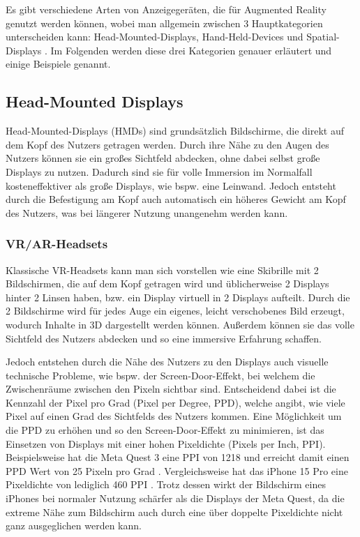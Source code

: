   Es gibt verschiedene Arten von Anzeigegeräten, die für Augmented Reality genutzt werden können, wobei man allgemein zwischen 3 Hauptkategorien unterscheiden kann: Head-Mounted-Displays, Hand-Held-Devices und Spatial-Displays \autocite[][S. 346]{Carmigniani2011}.
  Im Folgenden werden diese drei Kategorien genauer erläutert und einige Beispiele genannt.

  \newpage

  \subsection{Head-Mounted Displays}
    \label{section:hmds}
    Head-Mounted-Displays (HMDs) sind grundsätzlich Bildschirme, die direkt auf dem Kopf des Nutzers getragen werden.
    Durch ihre Nähe zu den Augen des Nutzers können sie ein großes Sichtfeld abdecken, ohne dabei selbst große Displays zu nutzen.
    Dadurch sind sie für volle Immersion im Normalfall kosteneffektiver als große Displays, wie bspw. eine Leinwand.
    Jedoch entsteht durch die Befestigung am Kopf auch automatisch ein höheres Gewicht am Kopf des Nutzers, was bei längerer Nutzung unangenehm werden kann.


    \subsubsection{VR/AR-Headsets}

    Klassische VR-Headsets kann man sich vorstellen wie eine Skibrille mit 2 Bildschirmen, die auf dem Kopf getragen wird und üblicherweise 2 Displays hinter 2 Linsen haben, bzw. ein Display virtuell in 2 Displays aufteilt.
    Durch die 2 Bildschirme wird für jedes Auge ein eigenes, leicht verschobenes Bild erzeugt, wodurch Inhalte in 3D dargestellt werden können.
    Außerdem können sie das volle Sichtfeld des Nutzers abdecken und so eine immersive Erfahrung schaffen.

    Jedoch entstehen durch die Nähe des Nutzers zu den Displays auch visuelle technische Probleme, wie bspw. der Screen-Door-Effekt, bei welchem die Zwischenräume zwischen den Pixeln sichtbar sind.
    Entscheidend dabei ist die Kennzahl der Pixel pro Grad (Pixel per Degree, PPD), welche angibt, wie viele Pixel auf einen Grad des Sichtfelds des Nutzers kommen.
    Eine Möglichkeit um die PPD zu erhöhen und so den Screen-Door-Effekt zu minimieren, ist das Einsetzen von Displays mit einer hohen Pixeldichte (Pixels per Inch, PPI).
    Beispielsweise hat die Meta Quest 3 eine PPI von 1218 und erreicht damit einen PPD Wert von 25 Pixeln pro Grad \autocite[]{meta-quest-3}.
    Vergleichsweise hat das iPhone 15 Pro eine Pixeldichte von lediglich 460 PPI \autocite[]{iPhone15Pro-datenblatt}.
    Trotz dessen wirkt der Bildschirm eines iPhones bei normaler Nutzung schärfer als die Displays der Meta Quest, da die extreme Nähe zum Bildschirm auch durch eine über doppelte Pixeldichte nicht ganz ausgeglichen werden kann.

